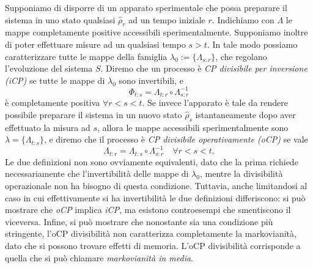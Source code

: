 Supponiamo di disporre di un apparato sperimentale che possa preparare il sistema in uno stato qualsiasi \(\hat{\rho}_r\) ad un tempo iniziale \(r\). Indichiamo con \(\Lambda\) le mappe completamente positive accessibili sperimentalmente. Supponiamo inoltre di poter effettuare misure ad un qualsiasi tempo \(s>t\). In tale modo possiamo caratterizzare tutte le mappe della famiglia \(\lambda_0 := \{\Lambda_{s\colon r}\}\), che regolano l'evoluzione del sistema \(S\). Diremo che un processo è \emph{CP divisibile per inversione (iCP)} se tutte le mappe di \(\lambda_0\) sono invertibili, e \[\Phi_{t\colon s} = \Lambda_{t\colon r} \circ \Lambda^{-1}_{s\colon r}\] è completamente positiva \(\forall r<s<t \). Se invece l'apparato è tale da rendere possibile preparare il sistema in un nuovo stato \(\hat{\rho}_s\) istantaneamente dopo aver effettuato la misura ad \(s\), allora le mappe accessibili sperimentalmente sono \(\lambda = \{\Lambda_{t\colon s}\}\), e diremo che il processo è \emph{CP divisibile operativamente (oCP)} se vale
\[\Lambda_{t\colon r} = \Lambda_{t\colon s} \circ \Lambda^{-1}_{s\colon r} \quad \forall r < s <  t.\]
Le due definizioni non sono ovviamente equivalenti, dato che la prima richiede necessariamente che l'invertibilità delle mappe di \(\lambda_0\), mentre la divisibilità operazionale non ha bisogno di questa condizione. Tuttavia, anche limitandosi al caso in cui effettivamente si ha invertibilità le due definizioni differiscono: si può mostrare che \emph{oCP} implica \emph{iCP}, ma esistono controesempi che smentiscono il viceversa. Infine, si può mostrare che nonostante sia una condizione più stringente, l'oCP divisibilità non caratterizza completamente la markovianità, dato che si possono trovare effetti di memoria. L'oCP divisibilità corrisponde a quella che si può chiamare \emph{markovianità in media}.
